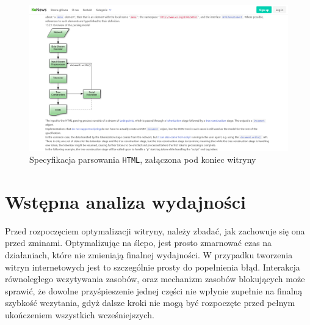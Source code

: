 \documentclass[licencjacka]{pracadypl}
\begin{document}
\begin{figure}[H]
  \includegraphics[width=\linewidth]{images/frontpage-spec.png}
  \caption{Specyfikacja parsowania \texttt{HTML}, załączona pod koniec witryny}
  \label{fig:frontpage-spec}
\end{figure}




\section{Wstępna analiza wydajności}
Przed rozpoczęciem optymalizacji witryny, należy zbadać, jak zachowuje się ona przed zminami. Optymalizując na ślepo, jest prosto zmarnować czas na działaniach, które nie zmieniają finalnej wydajności. W przypadku tworzenia witryn internetowych jest to szczególnie prosty do popełnienia błąd. Interakcja równoległego wczytywania zasobów, oraz mechanizm zasobów blokujących może sprawić, że dowolne przyśpieszenie jednej części nie wpłynie zupełnie na finalną szybkość wczytania, gdyż dalsze kroki nie mogą być rozpoczęte przed pełnym ukończeniem wszystkich wcześniejszych.
\end{document}
